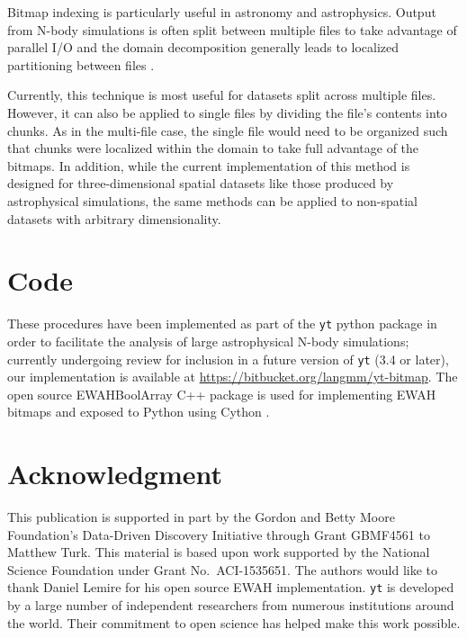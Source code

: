 \documentclass[apjl]{emulateapj}
\newcommand{\todo}[1]{{\color{red}{#1}}}
\begin{document}
Bitmap indexing is particularly useful in astronomy and astrophysics. Output from N-body simulations is often split between multiple files to take advantage of parallel I/O and the domain decomposition generally leads to localized partitioning between files \citep{Springel2001,Springel2005b,Hopkins2015}. %

Currently, this technique is most useful for datasets split across multiple files. However, it can also be applied to single files by dividing the file's contents into chunks. As in the multi-file case, the single file would need to be organized such that chunks were localized within the domain to take full advantage of the bitmaps. In addition, while the current implementation of this method is designed for three-dimensional spatial datasets like those produced by astrophysical simulations, the same methods can be applied to non-spatial datasets with arbitrary dimensionality.

\section*{Code}\label{S:code}
These procedures have been implemented as part of the {\tt yt} python package
\citep{Turk20d11a} in order to facilitate the analysis of large astrophysical
N-body simulations; currently undergoing review for inclusion in a future version of {\tt yt} (3.4 or later), our implementation is available at \url{https://bitbucket.org/langmm/yt-bitmap}. The open source EWAHBoolArray C++ package is used for implementing EWAH bitmaps \citep{Lemire2010,Kaser2016} and exposed to Python using Cython \citep{Behnel2011}. 

\section*{Acknowledgment}
This publication is supported in part by the Gordon and Betty Moore
Foundation’s Data-Driven Discovery Initiative through Grant GBMF4561 to Matthew
Turk.  This material is based upon work supported by the National Science
Foundation under Grant No.~ACI-1535651.  The authors would like to thank Daniel
Lemire for his open source EWAH implementation.  {\tt yt} is developed by a
large number of independent researchers from numerous institutions around the
world.  Their commitment to open science has helped make this work possible.
\end{document}
